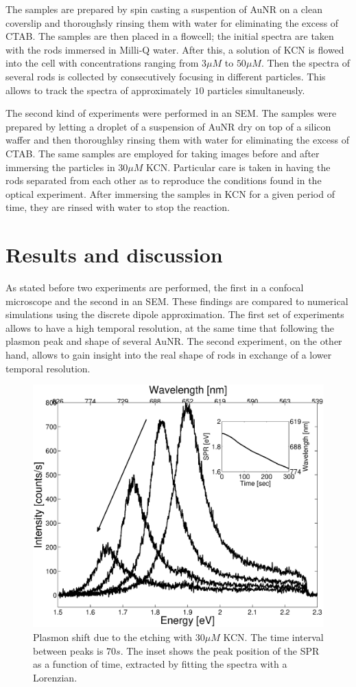 \documentclass[twocolumn]{article}
\begin{document}
The samples are prepared by spin casting a suspention of AuNR on a clean
coverslip and thoroughsly rinsing them  with water for eliminating the excess of
CTAB. The samples are then placed in a flowcell; the initial spectra are taken
with the rods immersed in Milli-Q water. After this, a solution of KCN is flowed
into the cell with concentrations ranging from $3\mu M$ to $50\mu M$. Then the
spectra of several rods is collected by consecutively focusing in different
particles. This allows to track the spectra of approximately $10$ particles
simultaneusly.

The second kind of experiments were performed in an SEM. The samples
were prepared by letting a droplet of a suspension of AuNR dry on top of a
silicon waffer and then thoroughlsy rinsing them with water for eliminating the
excess of CTAB. The same samples are employed for taking images before and after
immersing the particles in $30\mu M$ KCN. Particular care is taken in having the
rods separated from each other as to reproduce the conditions found in the
optical experiment. After immersing the samples in KCN for a given period of
time, they are rinsed with water to stop the reaction.

\section{Results and discussion}
As stated before two experiments are performed, the first in a
confocal microscope and the second in an SEM. These findings are compared to
numerical simulations using the discrete dipole approximation. The first set of
experiments allows to have a high temporal resolution, at the same time that
following the plasmon peak and shape of several AuNR. The second experiment, on
the other hand, allows to gain insight into the real shape of rods in exchange
of a lower temporal resolution. 

\begin{figure}[htb]
 \centering
 \includegraphics[width=0.9\linewidth]{plasmon_single_rod.eps}
 \caption{Plasmon shift due to the etching with $30\mu M$ KCN. The time
 interval between peaks is $70s$. The inset shows the peak position of the SPR as a
 function of time, extracted by fitting the spectra with a Lorenzian.}
 \label{fig:plasmon_single_rod}
\end{figure}
\end{document}
